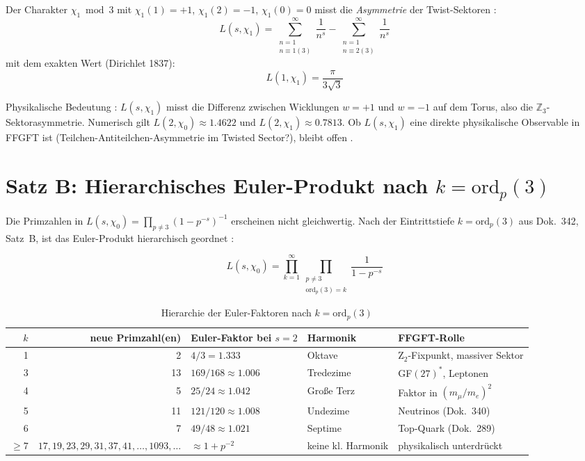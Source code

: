 Der Charakter $\chi_1 \bmod 3$ mit $\chi_1(1) = +1$, $\chi_1(2) = -1$,
$\chi_1(0) = 0$ misst die \emph{Asymmetrie} der Twist-Sektoren \BM:
\begin{equation}
  L(s,\chi_1) = \sum_{\substack{n=1\\n\equiv 1(3)}}^\infty \frac{1}{n^s}
              - \sum_{\substack{n=1\\n\equiv 2(3)}}^\infty \frac{1}{n^s}
\end{equation}
mit dem exakten Wert (Dirichlet 1837):
\begin{equation}
  L(1,\chi_1) = \frac{\pi}{3\sqrt{3}}
\end{equation}

Physikalische Bedeutung \SM: $L(s,\chi_1)$ misst die Differenz zwischen
Wicklungen $w = +1$ und $w = -1$ auf dem Torus, also die $\mathbb{Z}_3$-Sektor\-asymmetrie.
Numerisch gilt $L(2,\chi_0) \approx 1.4622$ und $L(2,\chi_1) \approx 0.7813$.
Ob $L(s,\chi_1)$ eine direkte physikalische Observable in FFGFT ist
(Teilchen-Antiteilchen-Asymmetrie im Twisted Sector?), bleibt offen \SM.

\section{Satz B: Hierarchisches Euler-Produkt nach $k = \mathrm{ord}_p(3)$}

Die Primzahlen in $L(s,\chi_0) = \prod_{p\neq 3}(1-p^{-s})^{-1}$
erscheinen nicht gleichwertig. Nach der Eintrittstiefe $k = \mathrm{ord}_p(3)$
aus Dok.~342, Satz~B, ist das Euler-Produkt hierarchisch geordnet \BM:

\begin{equation}
  L(s,\chi_0) = \prod_{k=1}^{\infty} \prod_{\substack{p\neq 3\\ \mathrm{ord}_p(3)=k}}
  \frac{1}{1 - p^{-s}}
\end{equation}

\begin{table}[H]
\centering
\caption{Hierarchie der Euler-Faktoren nach $k = \mathrm{ord}_p(3)$}
\begin{tabular}{rrlll}
\toprule
$k$ & neue Primzahl(en) & Euler-Faktor bei $s=2$ & Harmonik & FFGFT-Rolle \\
\midrule
1 & 2 & $4/3 = 1.333$ & Oktave & Z$_2$-Fixpunkt, massiver Sektor \\
3 & 13 & $169/168 \approx 1.006$ & Tredezime & GF$(27)^*$, Leptonen \\
4 & 5 & $25/24 \approx 1.042$ & Große Terz & Faktor in $(m_\mu/m_e)^2$ \\
5 & 11 & $121/120 \approx 1.008$ & Undezime & Neutrinos (Dok.~340) \\
6 & 7 & $49/48 \approx 1.021$ & Septime & Top-Quark (Dok.~289) \\
$\geq 7$ & $17, 19, 23, 29, 31, 37, 41, \ldots, 1093, \ldots$ & $\approx 1 + p^{-2}$ & keine kl. Harmonik & physikalisch unterdrückt \\
\bottomrule
\end{tabular}
\end{table}

